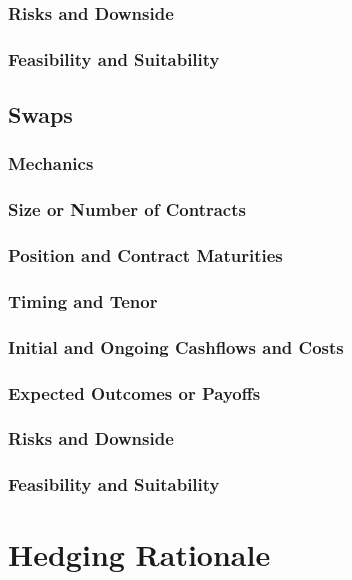 \documentclass[11pt, a4paper, british]{article}
\begin{document}
\subsubsection{Risks and Downside}

\subsubsection{Feasibility and Suitability}

\newpage

\subsection{Swaps}

\subsubsection{Mechanics}

\subsubsection{Size or Number of Contracts}

\subsubsection{Position and Contract Maturities}

\subsubsection{Timing and Tenor}

\subsubsection{Initial and Ongoing Cashflows and Costs}

\subsubsection{Expected Outcomes or Payoffs}

\subsubsection{Risks and Downside}

\subsubsection{Feasibility and Suitability}

\newpage

\section{Hedging Rationale}
\end{document}
